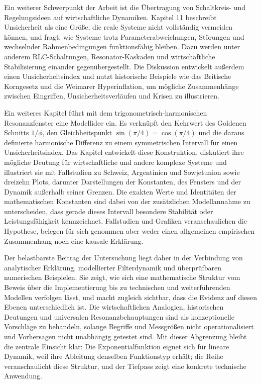 \documentclass[a4paper,12pt,twoside]{report}
\theoremstyle{definition}
\begin{document}
Ein weiterer Schwerpunkt der Arbeit ist die Übertragung von Schaltkreis- und Regelungsideen auf wirtschaftliche Dynamiken. Kapitel 11 beschreibt Unsicherheit als eine Größe, die reale Systeme nicht vollständig vermeiden können, und fragt, wie Systeme trotz Parameterabweichungen, Störungen und wechselnder Rahmenbedingungen funktionsfähig bleiben. Dazu werden unter anderem RLC-Schaltungen, Resonator-Kaskaden und wirtschaftliche Stabilisierung einander gegenübergestellt. Die Diskussion entwickelt außerdem einen Unsicherheitsindex und nutzt historische Beispiele wie das Britische Korngesetz und die Weimarer Hyperinflation, um mögliche Zusammenhänge zwischen Eingriffen, Unsicherheitsverläufen und Krisen zu illustrieren.

Ein weiteres Kapitel führt mit dem trigonometrisch-harmonischen Resonanzfenster eine Modellidee ein. Es verknüpft den Kehrwert des Goldenen Schnitts $1/\phi$, den Gleichheitspunkt $\sin(\pi/4)=\cos(\pi/4)$ und die daraus definierte harmonische Differenz zu einem symmetrischen Intervall für einen Unsicherheitsindex. Das Kapitel entwickelt diese Konstruktion, diskutiert ihre mögliche Deutung für wirtschaftliche und andere komplexe Systeme und illustriert sie mit Fallstudien zu Schweiz, Argentinien und Sowjetunion sowie dreizehn Plots, darunter Darstellungen der Konstanten, des Fensters und der Dynamik außerhalb seiner Grenzen. Die exakten Werte und Identitäten der mathematischen Konstanten sind dabei von der zusätzlichen Modellannahme zu unterscheiden, dass gerade dieses Intervall besondere Stabilität oder Leistungsfähigkeit kennzeichnet. Fallstudien und Grafiken veranschaulichen die Hypothese, belegen für sich genommen aber weder einen allgemeinen empirischen Zusammenhang noch eine kausale Erklärung.

Der belastbarste Beitrag der Untersuchung liegt daher in der Verbindung von analytischer Erklärung, modellierter Filterdynamik und überprüfbaren numerischen Beispielen. Sie zeigt, wie sich eine mathematische Struktur vom Beweis über die Implementierung bis zu technischen und weiterführenden Modellen verfolgen lässt, und macht zugleich sichtbar, dass die Evidenz auf diesen Ebenen unterschiedlich ist. Die wirtschaftlichen Analogien, historischen Deutungen und universalen Resonanzbehauptungen sind als konzeptionelle Vorschläge zu behandeln, solange Begriffe und Messgrößen nicht operationalisiert und Vorhersagen nicht unabhängig getestet sind. Mit dieser Abgrenzung bleibt die zentrale Einsicht klar: Die Exponentialfunktion eignet sich für lineare Dynamik, weil ihre Ableitung denselben Funktionstyp erhält; die Reihe veranschaulicht diese Struktur, und der Tiefpass zeigt eine konkrete technische Anwendung.
\end{document}
